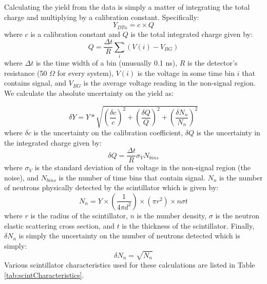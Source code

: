     Calculating the yield from the data is simply a matter of integrating the total charge and multiplying by a calibration constant. Specifically:
    \begin{equation}
        Y_{DTn} = c\times Q
    \end{equation}
    where $c$ is a calibration constant and $Q$ is the total integrated charge given by:
    \begin{equation}
        Q = \frac{\Delta t}{R}\sum_{i} \left(V(i) - V_{BG}\right) 
    \end{equation}
    where $\Delta t$ is the time width of a bin (unusually 0.1 ns), $R$ is the detector's resistance (50 $\Omega$ for every system), $V(i)$ is the voltage in some time bin $i$ that contains signal, and $V_{BG}$ is the average voltage reading in the non-signal region. We calculate the absolute uncertainty on the yield as:
    
    \begin{equation}
        \delta Y = Y * \sqrt{\left(\frac{\delta c}{c}\right)^2 + \left(\frac{\delta Q}{Q}\right)^2 + \left(\frac{\delta N_n}{N_n}\right)^2} 
    \end{equation}
    where $\delta c$ is the uncertainty on the calibration coefficient, $\delta Q$ is the uncertainty in the integrated charge given by:
    \begin{equation}
        \delta Q = \frac{\Delta t}{R} \sigma_V N_{bins}
    \end{equation}
    where $\sigma_V$ is the standard deviation of the voltage in the non-signal region (the noise), and $N_{bins}$ is the number of time bins that contain signal. $N_n$ is the number of neutrons physically detected by the scintillator which is given by:
    \begin{equation}
        N_n = Y \times \left(\frac{1}{4\pi d^2}\right)\times\left(\pi r^2\right) \times n\sigma t
    \end{equation}
    where $r$ is the radius of the scintillator, $n$ is the number density, $\sigma$ is the neutron elastic scattering cross section, and $t$ is the thickness of the scintillator. Finally, $\delta N_n$ is simply the uncertainty on the number of neutrons detected which is simply:
    \begin{equation}
        \delta N_n = \sqrt{N_n}
    \end{equation}
    Various scintillator characteristics used for these calculations are listed in Table \ref{tab:scintCharacteristics}.
    
